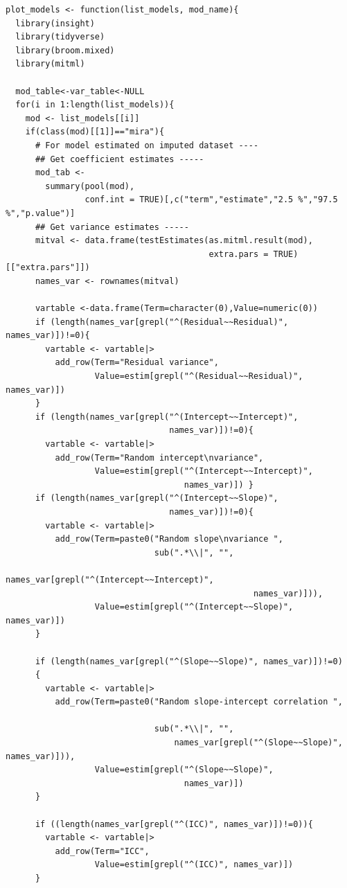 \documentclass[
  article]{jss}
\begin{document}
\begin{verbatim}
plot_models <- function(list_models, mod_name){
  library(insight)
  library(tidyverse)
  library(broom.mixed)
  library(mitml)
  
  mod_table<-var_table<-NULL
  for(i in 1:length(list_models)){
    mod <- list_models[[i]]  
    if(class(mod)[[1]]=="mira"){
      # For model estimated on imputed dataset ----
      ## Get coefficient estimates -----
      mod_tab <-
        summary(pool(mod), 
                conf.int = TRUE)[,c("term","estimate","2.5 %","97.5 %","p.value")] 
      ## Get variance estimates -----
      mitval <- data.frame(testEstimates(as.mitml.result(mod), 
                                         extra.pars = TRUE)[["extra.pars"]])
      names_var <- rownames(mitval)
      
      vartable <-data.frame(Term=character(0),Value=numeric(0))
      if (length(names_var[grepl("^(Residual~~Residual)", names_var)])!=0){
        vartable <- vartable|>
          add_row(Term="Residual variance",
                  Value=estim[grepl("^(Residual~~Residual)", names_var)])
      }
      if (length(names_var[grepl("^(Intercept~~Intercept)",
                                 names_var)])!=0){
        vartable <- vartable|>
          add_row(Term="Random intercept\nvariance",
                  Value=estim[grepl("^(Intercept~~Intercept)",
                                    names_var)]) }
      if (length(names_var[grepl("^(Intercept~~Slope)", 
                                 names_var)])!=0){
        vartable <- vartable|>
          add_row(Term=paste0("Random slope\nvariance ",
                              sub(".*\\|", "",
                                  names_var[grepl("^(Intercept~~Intercept)", 
                                                  names_var)])),
                  Value=estim[grepl("^(Intercept~~Slope)", names_var)])
      } 
      
      if (length(names_var[grepl("^(Slope~~Slope)", names_var)])!=0)
      {
        vartable <- vartable|>
          add_row(Term=paste0("Random slope-intercept correlation ",
                              
                              sub(".*\\|", "",
                                  names_var[grepl("^(Slope~~Slope)", names_var)])),
                  Value=estim[grepl("^(Slope~~Slope)",
                                    names_var)])
      }
      
      if ((length(names_var[grepl("^(ICC)", names_var)])!=0)){
        vartable <- vartable|>
          add_row(Term="ICC",
                  Value=estim[grepl("^(ICC)", names_var)])
      }
      

\end{verbatim}
\end{document}
